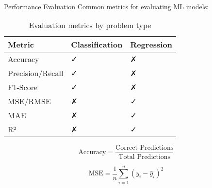 \documentclass[11pt,16:9,handout]{beamer}
\begin{document}
\begin{frame}{Performance Evaluation}
Common metrics for evaluating ML models:


\begin{table}[center]
    \centering
    \caption{Evaluation metrics by problem type}
    \begin{tabular}{lll}
    \toprule
        Metric & Classification & Regression \\
        \midrule
        Accuracy & ✓ & ✗ \\
        Precision/Recall & ✓ & ✗ \\
        F1-Score & ✓ & ✗ \\
        MSE/RMSE & ✗ & ✓ \\
        MAE & ✗ & ✓ \\
        R² & ✗ & ✓ \\
        \bottomrule
    \end{tabular}
    
    \label{tab:metrics}
\end{table}


\begin{equation}
\text{Accuracy} = \frac{\text{Correct Predictions}}{\text{Total Predictions}}
\end{equation}

\begin{equation}
\text{MSE} = \frac{1}{n}\sum_{i=1}^{n}(y_i - \hat{y}_i)^2
\end{equation}

\end{frame}


\end{document}
